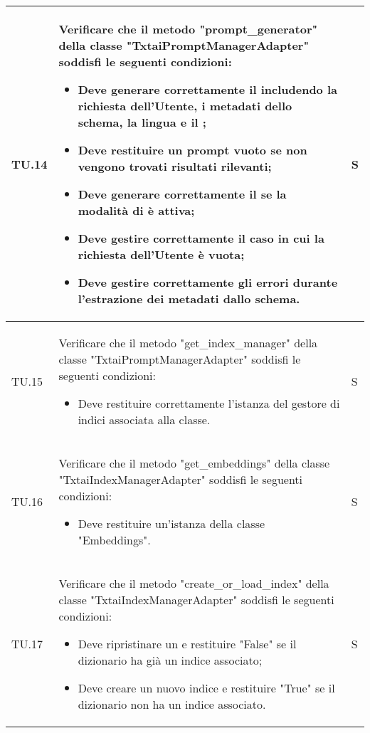 \begin{adjustwidth}{-0.5cm}{-0.5cm}
\begin{longtable}{|P{1.5cm}|>{\raggedright}P{9.5cm}|>{\arraybackslash}P{1.5cm}|}
		\hline TU.14 & Verificare che il metodo "prompt\_generator" della classe "TxtaiPromptManagerAdapter" soddisfi le seguenti condizioni:
		\begin{itemize}
			\item Deve generare correttamente il  includendo la richiesta dell'Utente, i metadati dello schema, la lingua e il ;
			\item Deve restituire un prompt vuoto se non vengono trovati risultati rilevanti;
			\item Deve generare correttamente il  se la modalità di  è attiva;
			\item Deve gestire correttamente il caso in cui la richiesta dell'Utente è vuota;
			\item Deve gestire correttamente gli errori durante l'estrazione dei metadati dallo schema.
		\end{itemize} & S \\

		\hline TU.15 & Verificare che il metodo "get\_index\_manager" della classe "TxtaiPromptManagerAdapter" soddisfi le seguenti condizioni:
		\begin{itemize}
			\item Deve restituire correttamente l'istanza del gestore di indici associata alla classe.
		\end{itemize} & S \\

		\hline TU.16 & Verificare che il metodo "get\_embeddings" della classe "TxtaiIndexManagerAdapter" soddisfi le seguenti condizioni:
		\begin{itemize}
			\item Deve restituire un'istanza della classe "Embeddings".
		\end{itemize} & S \\

		\hline TU.17 & Verificare che il metodo "create\_or\_load\_index" della classe "TxtaiIndexManagerAdapter" soddisfi le seguenti condizioni:
		\begin{itemize}
			\item Deve ripristinare un  e restituire "False" se il dizionario ha già un indice associato;
			\item Deve creare un nuovo indice e restituire "True" se il dizionario non ha un indice associato.
		\end{itemize} & S \\


\end{longtable}
\end{adjustwidth}
